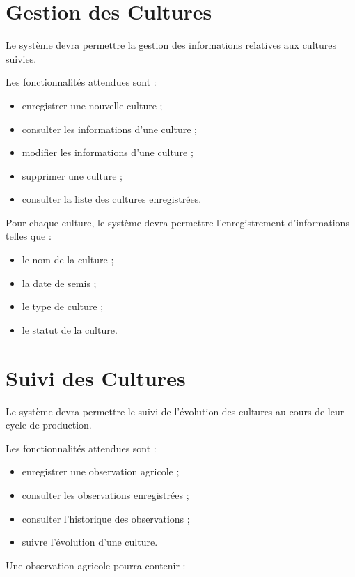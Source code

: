 \documentclass[12pt,a4paper]{report}
\begin{document}
\section{Gestion des Cultures}\label{gestion-des-cultures-1}

Le système devra permettre la gestion des informations relatives aux
cultures suivies.

Les fonctionnalités attendues sont :

\begin{itemize}
\item
  enregistrer une nouvelle culture ;
\item
  consulter les informations d'une culture ;
\item
  modifier les informations d'une culture ;
\item
  supprimer une culture ;
\item
  consulter la liste des cultures enregistrées.
\end{itemize}

Pour chaque culture, le système devra permettre l'enregistrement
d'informations telles que :

\begin{itemize}
\item
  le nom de la culture ;
\item
  la date de semis ;
\item
  le type de culture ;
\item
  le statut de la culture.
\end{itemize}

\section{Suivi des Cultures}\label{suivi-des-cultures-2}

Le système devra permettre le suivi de l'évolution des cultures au cours
de leur cycle de production.

Les fonctionnalités attendues sont :

\begin{itemize}
\item
  enregistrer une observation agricole ;
\item
  consulter les observations enregistrées ;
\item
  consulter l'historique des observations ;
\item
  suivre l'évolution d'une culture.
\end{itemize}

Une observation agricole pourra contenir :
\end{document}
